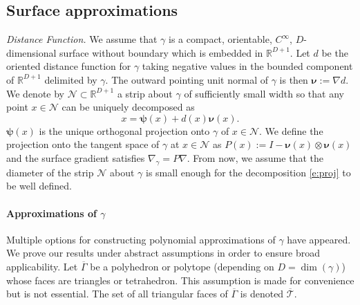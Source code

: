 \documentclass{siamart0516}
\newcommand{\bnu}{\ensuremath{\boldsymbol \nu}}
\newcommand{\bpsi}{\ensuremath{\boldsymbol \psi}}
\numberwithin{equation}{section}
\numberwithin{theorem}{section}
\numberwithin{figure}{section}
\begin{document}
\subsection{Surface approximations} \label{ss:prelim}
\textit{Distance Function.}
We assume that $\gamma$ is a compact, orientable, $C^\infty$,
$D$-dimensional surface without boundary which is embedded in $\mathbb{R}^{D+1}$. Let $d$ be the oriented distance function for $\gamma$ taking negative values in the bounded component of $\mathbb{R}^{D+1}$ delimited by $\gamma$. The outward pointing unit normal of $\gamma$ is then $\bnu := \nabla d$. We denote by $\mathcal{N}\subset \mathbb{R}^{D+1}$ a strip about $\gamma$ of sufficiently small width so that any point $x\in \mathcal{N}$ can be uniquely decomposed as 
\begin{equation}\label{e:proj}
x = \bpsi(x) +d(x)\bnu(x).
\end{equation}
$\bpsi(x)$ is the unique orthogonal projection onto $\gamma$ of $x\in \mathcal N$. We define the projection onto the tangent space of $\gamma$ at $x \in \mathcal N$ as $P(x) := I - \bnu(x)\otimes \bnu(x)$ and the surface gradient satisfies $\nabla_\gamma=P\nabla$.
From now, we assume that the diameter of the strip $\mathcal N$ about $\gamma$ is small enough for the decomposition \eqref{e:proj} to be well defined.

\paragraph{Approximations of $\gamma$}  Multiple options for constructing polynomial approximations of $\gamma$ have appeared. We prove our results under abstract assumptions in order to ensure broad applicability.  Let $\overline{\Gamma}$ be a polyhedron or polytope (depending on $D=\dim(\gamma)$) whose faces are triangles or tetrahedron.  This assumption is made for convenience but is not essential.  The set of all triangular faces of $\overline{\Gamma}$ is denoted $\overline{\mathcal T}$.
  
\end{document}
